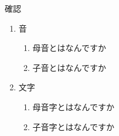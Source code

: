 \documentclass[aspectratio=169,xcolor={dvipsnames,table}]{beamer}
\begin{document}
\begin{frame}[plain]{確認}
\Large
 \begin{enumerate}
  \item 音
        \begin{enumerate}
	 \item 母音とはなんですか
	 \item 子音とはなんですか
	\end{enumerate}
  \item 文字
        \begin{enumerate}
	 \item 母音字とはなんですか
	 \item 子音字とはなんですか
	\end{enumerate}
 \end{enumerate}
\end{frame}
\end{document}
